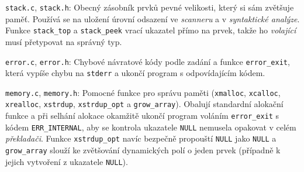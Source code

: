 \documentclass[11pt, a4paper]{article}
\begin{document}
\texttt{stack.c}, \texttt{stack.h}: Obecný zásobník prvků pevné velikosti, který si sám zvětšuje paměť. Používá se na uložení úrovní odsazení ve \emph{scanneru} a v \emph{syntaktické analýze}. Funkce \texttt{stack\_top} a \texttt{stack\_peek} vrací ukazatel přímo na prvek, takže ho \emph{volající} musí přetypovat na správný typ.

\texttt{error.c}, \texttt{error.h}: Chybové návratové kódy podle zadání a funkce \texttt{error\_exit}, která vypíše chybu na \texttt{stderr} a ukončí program s odpovídajícím kódem.

\texttt{memory.c}, \texttt{memory.h}: Pomocné funkce pro správu paměti (\texttt{xmalloc}, \texttt{xcalloc}, \texttt{xrealloc}, \texttt{xstrdup}, \texttt{xstrdup\_opt} a \texttt{grow\_array}). Obalují standardní alokační funkce a při selhání alokace okamžitě ukončí program voláním \texttt{error\_exit} s kódem \texttt{ERR\_INTERNAL}, aby se kontrola ukazatele \texttt{NULL} nemusela opakovat v celém \emph{překladači}. Funkce \texttt{xstrdup\_opt} navíc bezpečně propouští \texttt{NULL} jako \texttt{NULL} a \texttt{grow\_array} slouží ke zvětšování dynamických polí o jeden prvek (případně k jejich vytvoření z ukazatele \texttt{NULL}).
\end{document}
